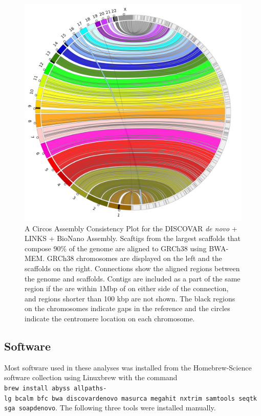\documentclass[
  12pt,
  oneside,
  openany]{book}
\begin{document}
\begin{appendices}
\begin{figure}
\hypertarget{fig:jup6}{%
\centering
\includegraphics{abyss2-appendix/discovardenovo_links_bionano.png}
\caption[A Circos Assembly Consistency Plot for the DISCOVAR \emph{de novo} + LINKS + BioNano Assembly.]{A Circos Assembly Consistency Plot for the DISCOVAR \emph{de novo} + LINKS + BioNano Assembly. Scaftigs from the largest scaffolds that compose 90\% of the genome are aligned to GRCh38 using BWA-MEM. GRCh38 chromosomes are displayed on the left and the scaffolds on the right. Connections show the aligned regions between the genome and scaffolds. Contigs are included as a part of the same region if the are within 1Mbp of on either side of the connection, and regions shorter than 100 kbp are not shown. The black regions on the chromosomes indicate gaps in the reference and the circles indicate the centromere location on each chromosome.}\label{fig:jup6}
}
\end{figure}

\clearpage

\hypertarget{software}{%
\subsection{Software}\label{software}}

Most software used in these analyses was installed from the Homebrew-Science software collection using Linuxbrew with the command \texttt{brew\ install\ abyss\ allpaths-lg\ bcalm\ bfc\ bwa\ discovardenovo\ masurca\ megahit\ nxtrim\ samtools\ seqtk\ sga\ soapdenovo}. The following three tools were installed manually.


\end{appendices}
\end{document}
